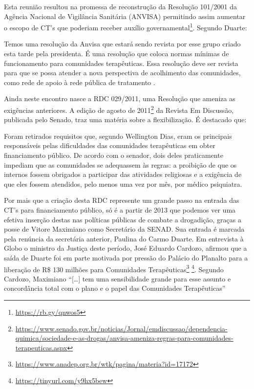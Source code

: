 \documentclass[
	12pt,				%
	oneside,			%
	a4paper,			%
	sumario=tradicional,
	english,			%
	brazil				%
	]{abntex2}
\begin{document}
Esta reunião resultou na promessa de reconstrução da Resolução 101/2001 da Agência Nacional de Vigilância Sanitária (\acrshort{ANVISA}) permitindo assim aumentar o escopo de CT's que poderiam receber auxílio governamental\footnote{\url{https://rb.gy/qnwos5}}. Segundo Duarte:
\begin{quoting}[rightmargin=0cm,leftmargin=4cm]
\begin{singlespace}
{\footnotesize 
Temos uma resolução da Anvisa que estará sendo revista por esse grupo criado esta tarde pela presidenta. É uma resolução que coloca normas mínimas de funcionamento para comunidades terapêuticas. Essa resolução deve ser revista para que se possa atender a nova perspectiva de acolhimento das comunidades, como rede de apoio à rede pública de tratamento \cite{ultimato2011}.}
\end{singlespace}  
\end{quoting}
Ainda neste encontro nasce a \acrshort{RDC} 029/2011, uma Resolução que ameniza as exigências anteriores. A edição de agosto de 2011\footnote{\url{https://www.senado.gov.br/noticias/Jornal/emdiscussao/dependencia-quimica/sociedade-e-as-drogas/anvisa-ameniza-regras-para-comunidades-terapeuticas.aspx}} da Revista Em Discussão, publicada pelo Senado, traz uma matéria sobre a flexibilização. É destacado que:
\begin{quoting}[rightmargin=0cm,leftmargin=4cm]
\begin{singlespace}
{\footnotesize 
Foram retirados requisitos que, segundo Wellington Dias, eram os principais responsáveis pelas dificuldades das comunidades terapêuticas em obter financiamento público. De acordo com o senador, dois deles praticamente impediam que as comunidades se adequassem às regras: a proibição de que os internos fossem obrigados a participar das atividades religiosas e a exigência de que eles fossem atendidos, pelo menos uma vez por mês, por médico psiquiatra. \cite[p. 67]{discussao2011}}
\end{singlespace}  
\end{quoting}
Por mais que a criação desta RDC represente um grande passo na entrada das CT's para financiamento público, só é a partir de 2013 que podemos ver uma efetiva inserção destas nas políticas públicas de combate a drogadição, graças a posse de Vitore Maximiano como Secretário da SENAD. Sua entrada é marcada pela renúncia da secretária anterior, Paulina do Carmo Duarte. Em entrevista à Globo o ministro da Justiça deste período, José Eduardo Cardozo, afirmou que a saída de Duarte foi em parte motivada por pressão do Palácio do Planalto para a liberação de R\$ 130 milhões para Comunidades Terapêuticas\footnote{\url{https://www.anadep.org.br/wtk/pagina/materia?id=17172}} \footnote{\url{https://tinyurl.com/y9hx5bew}}. Segundo Cardozo, Maximiano ``{[}\ldots{]} tem uma sensibilidade grande para esse assunto e concordância total com o plano e o papel das Comunidades Terapêuticas''
\end{document}
